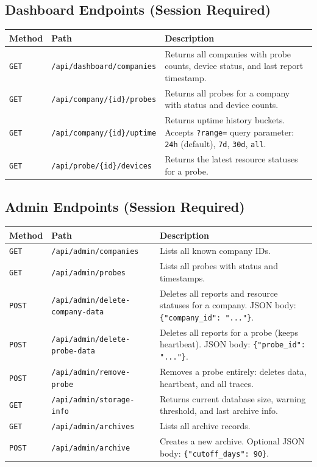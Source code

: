 \documentclass[12pt]{report}
\begin{document}
\subsection{Dashboard Endpoints (Session Required)}

\begin{longtable}{@{} l l p{5.5cm} @{}}
\toprule
\textbf{Method} & \textbf{Path} & \textbf{Description} \\
\midrule
\texttt{GET} & \texttt{/api/dashboard/companies} & Returns all companies with
    probe counts, device status, and last report timestamp. \\
\texttt{GET} & \texttt{/api/company/\{id\}/probes} & Returns all probes for a
    company with status and device counts. \\
\texttt{GET} & \texttt{/api/company/\{id\}/uptime} & Returns uptime history
    buckets. Accepts \texttt{?range=} query parameter: \texttt{24h} (default),
    \texttt{7d}, \texttt{30d}, \texttt{all}. \\
\texttt{GET} & \texttt{/api/probe/\{id\}/devices} & Returns the latest
    resource statuses for a probe. \\
\bottomrule
\end{longtable}

\subsection{Admin Endpoints (Session Required)}

\begin{longtable}{@{} l l p{5cm} @{}}
\toprule
\textbf{Method} & \textbf{Path} & \textbf{Description} \\
\midrule
\texttt{GET} & \texttt{/api/admin/companies} & Lists all known company IDs.
    \\
\texttt{GET} & \texttt{/api/admin/probes} & Lists all probes with status and
    timestamps. \\
\texttt{POST} & \texttt{/api/admin/delete-company-data} & Deletes all reports
    and resource statuses for a company. JSON body:
    \texttt{\{"company\_id": "..."\}}. \\
\texttt{POST} & \texttt{/api/admin/delete-probe-data} & Deletes all reports
    for a probe (keeps heartbeat). JSON body:
    \texttt{\{"probe\_id": "..."\}}. \\
\texttt{POST} & \texttt{/api/admin/remove-probe} & Removes a probe entirely:
    deletes data, heartbeat, and all traces. \\
\texttt{GET} & \texttt{/api/admin/storage-info} & Returns current database
    size, warning threshold, and last archive info. \\
\texttt{GET} & \texttt{/api/admin/archives} & Lists all archive records. \\
\texttt{POST} & \texttt{/api/admin/archive} & Creates a new archive. Optional
    JSON body: \texttt{\{"cutoff\_days": 90\}}. \\
\bottomrule
\end{longtable}
\end{document}
